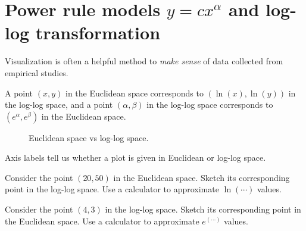 \documentclass[../main.tex]{subfiles}
\begin{document}
 \section{Power rule models \texorpdfstring{\(y =  c x^{\alpha}\)}{} and log-log transformation}

Visualization is often a helpful method to \emph{make sense} of data collected from empirical studies.

\begin{definition} \label{def:log-log-space}
  A point \((x,y)\) in the Euclidean space corresponds to \((\ln(x), \ln(y))\) in the log-log space, and a point \((\alpha,\beta)\) in the log-log space corresponds to \((e^{\alpha}, e^{\beta})\) in the Euclidean space.
\end{definition}


\begin{figure}[H] %
  \centering
  
  \hfill{}
  
  \hfill{}
  
  \hfill{}

  \caption{Euclidean space vs log-log space.}
  \label{fig:figure}
\end{figure}

\faExclamationTriangle{} Axis labels tell us whether a plot is given in Euclidean or log-log space.

\begin{exercise} \label{ex:log-log-euclidean-to-loglog}
  Consider the point \((20, 50)\) in the Euclidean space. Sketch its corresponding point  in the log-log space. Use a calculator to approximate \(\ln(\cdots)\) values.

\end{exercise}

\begin{exercise} \label{ex:log-log-loglog-to-euclidean}
  Consider the point \((4, 3)\) in the log-log space. Sketch its corresponding point  in the Euclidean space. Use a calculator to approximate \(e^{(\cdots)}\) values.

  \blanks*
\end{exercise}
\end{document}
